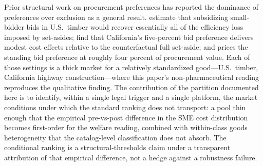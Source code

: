 Prior structural work on procurement preferences has reported the dominance of preferences over exclusion as a general result. \citet{athey2013} estimate that subsidizing small-bidder bids in U.S.\ timber would recover essentially all of the efficiency loss imposed by set-asides; \citet{krasnokutskayaseim2011} find that California's five-percent bid preference delivers modest cost effects relative to the counterfactual full set-aside; and \citet{marion2007} prices the standing bid preference at roughly four percent of procurement value. Each of those settings is a thick market for a relatively standardized good---U.S.\ timber, California highway construction---where this paper's non-pharmaceutical reading reproduces the qualitative finding. The contribution of the partition documented here is to identify, within a single legal trigger and a single platform, the market conditions under which the standard ranking does not transport: a pool thin enough that the empirical pre-vs-post difference in the SME cost distribution becomes first-order for the welfare reading, combined with within-class goods heterogeneity that the catalog-level classification does not absorb. The conditional ranking is a structural-thresholds claim under a transparent attribution of that empirical difference, not a hedge against a robustness failure.

